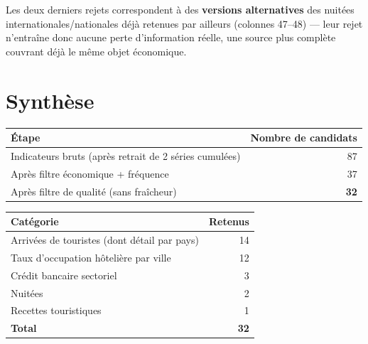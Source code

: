 \documentclass[11pt,a4paper]{article}
\begin{document}
Les deux derniers rejets correspondent à des \textbf{versions alternatives} des nuitées internationales/nationales déjà retenues par ailleurs (colonnes 47--48) --- leur rejet n'entraîne donc aucune perte d'information réelle, une source plus complète couvrant déjà le même objet économique.

\section{Synthèse}

\begin{fichebox}
\begin{center}
\begin{tabular}{lr}
\toprule
\textbf{Étape} & \textbf{Nombre de candidats} \\
\midrule
Indicateurs bruts (après retrait de 2 séries cumulées) & 87 \\
Après filtre économique + fréquence & 37 \\
Après filtre de qualité (sans fraîcheur) & \textbf{32} \\
\bottomrule
\end{tabular}
\end{center}
\end{fichebox}

\begin{center}
\small
\begin{tabular}{lr}
\toprule
\textbf{Catégorie} & \textbf{Retenus} \\
\midrule
Arrivées de touristes (dont détail par pays) & 14 \\
Taux d'occupation hôtelière par ville & 12 \\
Crédit bancaire sectoriel & 3 \\
Nuitées & 2 \\
Recettes touristiques & 1 \\
\midrule
\textbf{Total} & \textbf{32} \\
\bottomrule
\end{tabular}
\end{center}
\end{document}
